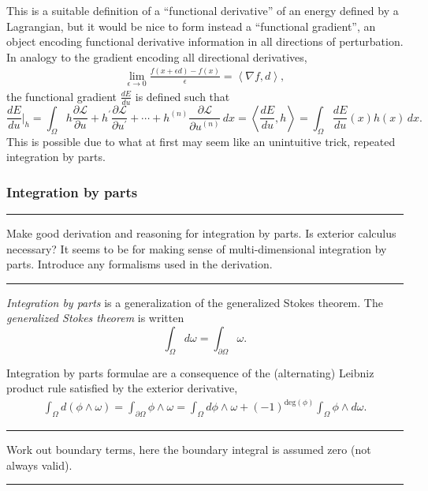 \documentclass{article}
\newcommand{\inner}[1]{\left<#1\right>}
\newcommand{\fancyL}{\mathcal{L}}
\newcommand{\om}{\Omega}
\newcommand{\pom}{{\partial\Omega}}
\newcommand{\todo}[1]{\vskip 0.1in \hrule \vskip 0.03in {#1} \vskip 0.03in \hrule \vskip 0.1in}
\begin{document}
This is a suitable definition of a ``functional derivative'' of an energy defined by a Lagrangian,
but it would be nice to form instead a ``functional gradient'', an object encoding functional derivative information
in all directions of perturbation.
In analogy to the gradient encoding all directional derivatives,
\begin{align*}
    \lim_{\epsilon\rightarrow 0} \frac{f(x + \epsilon d) - f(x)}{\epsilon} = \inner{\nabla f, d},
\end{align*}
the functional gradient $\frac{dE}{du}$ is defined such that
    $$\frac{dE}{du}\Big|_h
    = \int_\Omega h\frac{\partial\mathcal{L}}{\partial u} + h^\prime\frac{\partial\fancyL}{\partial u^\prime} + \cdots + h^{(n)}\frac{\partial\fancyL}{\partial u^{(n)}}\,dx
     = \inner{\frac{dE}{du}, h} = \int_\Omega \frac{dE}{du}(x)h(x)\,dx.
$$
This is possible due to what at first may seem like an unintuitive trick, repeated integration by parts.



\subsubsection{Integration by parts}
\todo{Make good derivation and reasoning for integration by parts. Is exterior calculus necessary? It seems
to be for making sense of multi-dimensional integration by parts. Introduce any formalisms used in the derivation.}
\textit{Integration by parts} is a generalization of the generalized Stokes theorem.
The \textit{generalized Stokes theorem} is written
\begin{equation}\label{generalized_stokes}
    \int_\om d\omega = \int_\pom \omega.
\end{equation}

Integration by parts formulae are a consequence of the (alternating) Leibniz product rule satisfied by the exterior derivative,
\begin{align*}
    \int_\om d(\phi\wedge \omega) = \int_\pom \phi\wedge\omega
        = \int_\om d\phi \wedge \omega + (-1)^{\text{deg}(\phi)}\int_\om \phi \wedge d\omega.
\end{align*}

\todo{Work out boundary terms, here the boundary integral is assumed zero (not always valid).}
\end{document}
